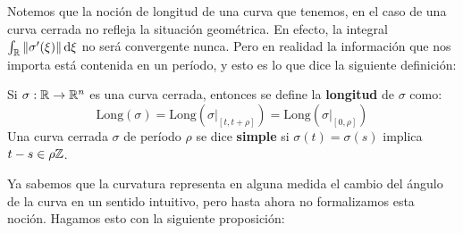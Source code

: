 Notemos que la noción de longitud de una curva que tenemos, en el caso de una curva cerrada no refleja la situación geométrica. En efecto, la integral $\int_{\mathbb{R}} \left\| \sigma'(\xi) \right\|\mathop{}\!\mathrm{d}\xi$ no será convergente nunca. Pero en realidad la información que nos importa está contenida en un período, y esto es lo que dice la siguiente definición:

\begin{defn}
Si $\sigma:\mathbb{R}\to\mathbb{R}^n$ es una curva cerrada, entonces se define la \textbf{longitud} de $\sigma$ como: $$\mathrm{Long}(\sigma)=\mathrm{Long}(\left.\sigma\right|_{[t,t+\rho]}) = \mathrm{Long}(\left.\sigma\right|_{[0,\rho]})$$
Una curva cerrada $\sigma$ de período $\rho$ se dice \textbf{simple} si $\sigma(t)=\sigma(s)$ implica $t-s\in\rho\mathbb{Z}$.
\end{defn}

Ya sabemos que la curvatura representa en alguna medida el cambio del ángulo de la curva en un sentido intuitivo, pero hasta ahora no formalizamos esta noción. Hagamos esto con la siguiente proposición:

